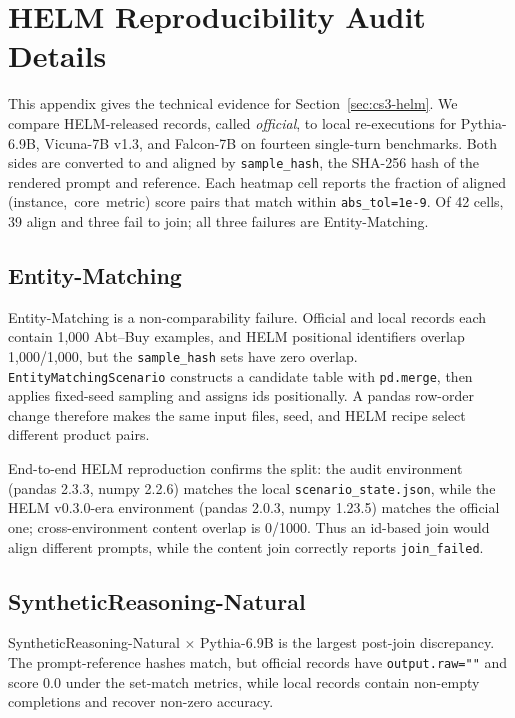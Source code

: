 \section{HELM Reproducibility Audit Details}
\label{sec:app-helm-audit}

This appendix gives the technical evidence for Section~\ref{sec:cs3-helm}. We
compare HELM-released records, called \emph{official}, to local re-executions
for Pythia-6.9B, Vicuna-7B v1.3, and Falcon-7B on fourteen single-turn
benchmarks. Both sides are converted to \eee{} and aligned by
\texttt{sample\_hash}, the SHA-256 hash of the rendered prompt and reference.
Each heatmap cell reports the fraction of aligned \mbox{(instance, core metric)}
score pairs that match within \texttt{abs\_tol=1e-9}. Of 42 cells, 39 align and
three fail to join; all three failures are Entity-Matching.

\subsection{Entity-Matching}
\label{sec:app-helm-entity-matching}

Entity-Matching is a non-comparability failure. Official and local records each
contain 1,000 Abt--Buy examples, and HELM positional identifiers overlap
1,000/1,000, but the \texttt{sample\_hash} sets have zero overlap.
\texttt{EntityMatchingScenario} constructs a candidate table with
\texttt{pd.merge}, then applies fixed-seed sampling and assigns ids
positionally. A pandas row-order change therefore makes the same input files,
seed, and HELM recipe select different product pairs.

End-to-end HELM reproduction confirms the split: the audit environment
(pandas 2.3.3, numpy 2.2.6) matches the local
\texttt{scenario\_state.json}, while the HELM v0.3.0-era environment
(pandas 2.0.3, numpy 1.23.5) matches the official one; cross-environment
content overlap is 0/1000. Thus an id-based join would align different prompts,
while the \eee{} content join correctly reports \texttt{join\_failed}.

\subsection{SyntheticReasoning-Natural}
\label{sec:app-helm-sr-natural}

SyntheticReasoning-Natural $\times$ Pythia-6.9B is the largest post-join
discrepancy. The prompt-reference hashes match, but official records have
\texttt{output.raw=""} and score 0.0 under the set-match metrics, while local
records contain non-empty completions and recover non-zero accuracy.


